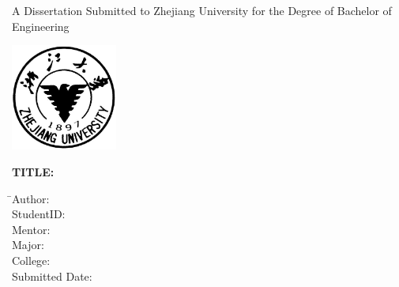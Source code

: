 
\newpage
\thispagestyle{empty}

\vspace{5mm}

\begin{center}
    \songti\xiaoyi A Dissertation Submitted to Zhejiang University for the Degree of Bachelor of Engineering
\end{center}

\vspace{4mm}

\begin{center}
  \includegraphics[width=35mm]{images/standxb}
\end{center}

\vspace{25mm}

{\hspace{3mm}\songti\sanhao\bfseries TITLE:\hspace{4mm}\begin{minipage}[t]{124mm}\end{minipage}}

\vspace{7mm}

\begin{tabbing}
    \hspace{18mm} \= \sanhao Author:\hspace{19mm} \= \underline{\makebox[8cm]{\sanhao\zjuauthornamee}} \\[2mm]
    \> \sanhao StudentID:\hspace{19mm} \> \underline{\makebox[8cm]{\sanhao\zjuauthorid}} \\[2mm]
    \> \sanhao Mentor:\hspace{19mm} \> \underline{\makebox[8cm]{\sanhao\zjumentore}} \\[2mm]
    \> \sanhao Major: \> \underline{\makebox[8cm]{\sanhao\zjumajore}} \\[2mm]
    \> \sanhao College: \> \underline{\makebox[8cm]{\sanhao\zjucollegee}} \\[2mm]
    \> \sanhao Submitted Date: \> \underline{\makebox[8cm]{\sanhao\zjusubmitteddatee}}
\end{tabbing}

